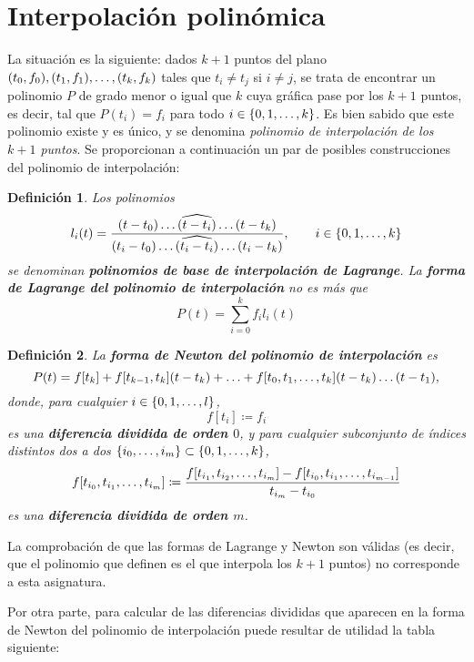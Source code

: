 \documentclass[11pt]{report}
\theoremstyle{mytheorem}
\theoremstyle{mydefinition}
\newtheorem{definition}{Definición}
\theoremstyle{myexample}
\newenvironment{cdefinition} %
  {\begin{mdframed}[
        linewidth=3pt,
        linecolor=c1,
        bottomline=false,
        topline=false,
        rightline=false,
        innerrightmargin=0pt,
        innertopmargin=0pt,
        innerbottommargin=0pt,
        innerleftmargin=1em, %
        skipabove=\baselineskip]
    \begin{definition}}
  {\end{definition}\end{mdframed}}
\newcommand{\mybf}[1]{\boldmath\textbf{\color{c1}#1}\unboldmath}
\begin{document}
\section{Interpolación polinómica}

La situación es la siguiente: dados $k+1$ puntos del plano $(t_0,f_0),(t_1,f_1),\mathellipsis,(t_k,f_k)$ tales que $t_i \neq t_j$ si $i \neq j$, se trata de encontrar un polinomio $P$ de grado menor o igual que $k$ cuya gráfica pase por los $k+1$ puntos, es decir, tal que $P(t_i) = f_i$ para todo $i \in \{0,1,\mathellipsis,k\}$. Es bien sabido que este polinomio existe y es único, y se denomina \emph{polinomio de interpolación de los $k+1$ puntos}. Se proporcionan a continuación un par de posibles construcciones del polinomio de interpolación:

\begin{cdefinition}
Los polinomios
\[l_i(t) = \frac{(t-t_0)\mathellipsis\widehat{(t-t_i)}\mathellipsis(t-t_k)}{(t_i-t_0)\mathellipsis\widehat{(t_i-t_i)}\mathellipsis(t_i-t_k)}, \qquad i \in \{0,1,\mathellipsis,k\}\]
se denominan \mybf{polinomios de base de interpolación de Lagrange}. La \mybf{forma de Lagrange del polinomio de interpolación} no es más que
\[P(t) = \sum_{i=0}^kf_il_i(t)\]
\end{cdefinition}

\begin{cdefinition}
La \mybf{forma de Newton del polinomio de interpolación} es
\[P(t) = f[t_k]+f[t_{k-1},t_k](t-t_k)+\mathellipsis+f[t_0,t_1,\mathellipsis,t_k](t-t_k)\mathellipsis(t-t_{1}),\]
donde,  para cualquier $i \in \{0,1,\mathellipsis,l\}$, 
\[f[t_i] \coloneqq f_i\]
es una \mybf{diferencia dividida de orden $0$}, y para cualquier subconjunto de índices distintos dos a dos $\{i_0,\mathellipsis,i_m\} \subset \{0,1,\mathellipsis,k\}$,
\[f[t_{i_0},t_{i_1},\mathellipsis,t_{i_m}] \coloneqq \frac{f[t_{i_1},t_{i_2},\mathellipsis,t_{i_m}]-f[t_{i_0},t_{i_1},\mathellipsis,t_{i_{m-1}}]}{t_{i_m}-t_{i_0}}\]
es una \mybf{diferencia dividida de orden $m$}.
\end{cdefinition}

La comprobación de que las formas de Lagrange y Newton son válidas (es decir, que el polinomio que definen es el que interpola los $k+1$ puntos) no corresponde a esta asignatura. 

Por otra parte, para calcular de las diferencias divididas que aparecen en la forma de Newton del polinomio de interpolación puede resultar de utilidad la tabla siguiente:

\vspace{0.5\baselineskip}
\end{document}
